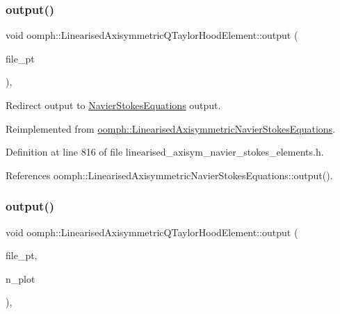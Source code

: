 \subsubsection{\texorpdfstring{output()}{output()}\hspace{0.1cm}{\footnotesize\ttfamily [3/4]}}
{\footnotesize\ttfamily void oomph\+::\+Linearised\+Axisymmetric\+Q\+Taylor\+Hood\+Element\+::output (\begin{DoxyParamCaption}\item[{F\+I\+LE $\ast$}]{file\+\_\+pt }\end{DoxyParamCaption})\hspace{0.3cm}{\ttfamily [inline]}, {\ttfamily [virtual]}}



Redirect output to \hyperlink{classoomph_1_1NavierStokesEquations}{Navier\+Stokes\+Equations} output. 



Reimplemented from \hyperlink{classoomph_1_1LinearisedAxisymmetricNavierStokesEquations_a11528829faa67968adcb46ad7cfa1fb2}{oomph\+::\+Linearised\+Axisymmetric\+Navier\+Stokes\+Equations}.



Definition at line 816 of file linearised\+\_\+axisym\+\_\+navier\+\_\+stokes\+\_\+elements.\+h.



References oomph\+::\+Linearised\+Axisymmetric\+Navier\+Stokes\+Equations\+::output().

\mbox{\label{classoomph_1_1LinearisedAxisymmetricQTaylorHoodElement_ad3c9effcb6919a0d639e50a89c91323d}} 
\subsubsection{\texorpdfstring{output()}{output()}\hspace{0.1cm}{\footnotesize\ttfamily [4/4]}}
{\footnotesize\ttfamily void oomph\+::\+Linearised\+Axisymmetric\+Q\+Taylor\+Hood\+Element\+::output (\begin{DoxyParamCaption}\item[{F\+I\+LE $\ast$}]{file\+\_\+pt,  }\item[{const unsigned \&}]{n\+\_\+plot }\end{DoxyParamCaption})\hspace{0.3cm}{\ttfamily [inline]}, {\ttfamily [virtual]}}



